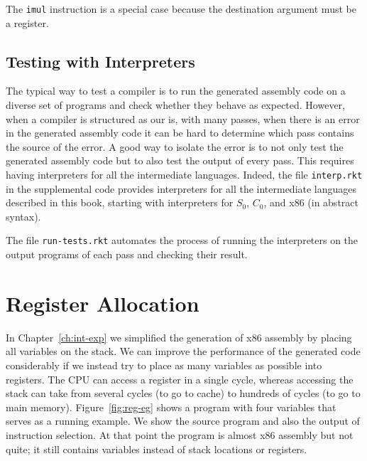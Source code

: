 \documentclass[12pt]{book}
\newcommand{\key}[1]{\texttt{#1}}
\begin{document}
The \key{imul} instruction is a special case because the destination
argument must be a register.

\section{Testing with Interpreters}

The typical way to test a compiler is to run the generated assembly
code on a diverse set of programs and check whether they behave as
expected. However, when a compiler is structured as our is, with many
passes, when there is an error in the generated assembly code it can
be hard to determine which pass contains the source of the error.  A
good way to isolate the error is to not only test the generated
assembly code but to also test the output of every pass. This requires
having interpreters for all the intermediate languages.  Indeed, the
file \key{interp.rkt} in the supplemental code provides interpreters
for all the intermediate languages described in this book, starting
with interpreters for $S_0$, $C_0$, and x86 (in abstract syntax).

The file \key{run-tests.rkt} automates the process of running the
interpreters on the output programs of each pass and checking their
result.

\chapter{Register Allocation}
\label{ch:register-allocation}

In Chapter~\ref{ch:int-exp} we simplified the generation of x86
assembly by placing all variables on the stack. We can improve the
performance of the generated code considerably if we instead try to
place as many variables as possible into registers.  The CPU can
access a register in a single cycle, whereas accessing the stack can
take from several cycles (to go to cache) to hundreds of cycles (to go
to main memory).  Figure~\ref{fig:reg-eg} shows a program with four
variables that serves as a running example. We show the source program
and also the output of instruction selection. At that point the
program is almost x86 assembly but not quite; it still contains
variables instead of stack locations or registers.
\end{document}
